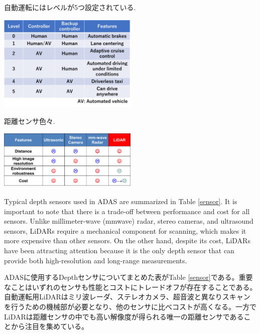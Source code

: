 \documentclass[letterpaper, 10 pt, conference]{ieeeconf}  %
\begin{document}
\begin{table}[!t]
\centering
\caption{自動運転にはレベルが5つ設定されている.}
 \includegraphics[width=0.5\textwidth]{figs/ses.png}
\label{sae}
\end{table}

\begin{table}[!t]
\centering
\caption{距離センサ色々.}
 \includegraphics[width=0.5\textwidth]{figs/distancesensor.png}
\label{sensor}
\end{table}

Typical depth sensors used in ADAS are summarized in Table \ref{sensor}. It is important to note that there is a trade-off between performance and cost for all sensors.
Unlike millimeter-wave (mmwave) radar, stereo cameras, and ultrasound sensors, LiDARs require a mechanical component for scanning, which makes it more expensive than other sensors. On the other hand, despite its cost, LiDARs have been attracting attention because it is the only depth sensor that can provide both high-resolution and long-range measurements.



ADASに使用するDepthセンサについてまとめた表がTable \ref{sensor}である。重要なことはいずれのセンサも性能とコストにトレードオフが存在することである。
自動運転用LiDARはミリ波レーダ、ステレオカメラ、超音波と異なりスキャンを行うための機械部が必要となり、他のセンサに比べコストが高くなる。一方でLiDARは距離センサの中でも高い解像度が得られる唯一の距離センサであることから注目を集めている。
\end{document}
